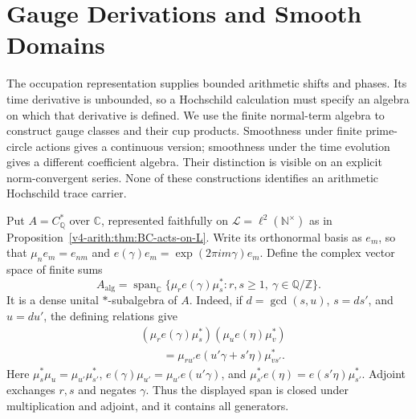 \section{Gauge Derivations and Smooth Domains}
\label{v4-arith:cs:HH-comparison}

The occupation representation supplies bounded arithmetic shifts and
phases. Its time derivative is unbounded, so a Hochschild calculation
must specify an algebra on which that derivative is defined. We use
the finite normal-term algebra to construct gauge classes and their
cup products. Smoothness under finite prime-circle actions gives a
continuous version; smoothness under the time evolution gives a
different coefficient algebra. Their distinction is visible on an
explicit norm-convergent series. None of these constructions identifies
an arithmetic Hochschild trace carrier.

Put \(A=C_{\mathbb Q}^*\) over \(\mathbb C\), represented faithfully
on \(\mathcal L=\ell^2(\mathbb N^\times)\) as in
Proposition~\ref{v4-arith:thm:BC-acts-on-L}. Write its orthonormal
basis as \(e_m\), so that
\(\mu_n e_m=e_{nm}\) and
\(e(\gamma)e_m=\exp(2\pi i m\gamma)e_m\).
Define the complex vector space of finite sums
\[
 A_{\mathrm{alg}}=
 \operatorname{span}_{\mathbb C}
 \{\mu_r e(\gamma)\mu_s^*:r,s\ge1,\ \gamma\in\mathbb Q/\mathbb Z\}.
\]
It is a dense unital \(*\)-subalgebra of \(A\). Indeed, if
\(d=\gcd(s,u)\), \(s=ds'\), and \(u=du'\), the defining relations give
\begin{align*}
 &(\mu_r e(\gamma)\mu_s^*)(\mu_u e(\eta)\mu_v^*)\\
 &\hspace{2em}=\mu_{ru'}e(u'\gamma+s'\eta)\mu_{vs'}^*.
\end{align*}
Here \(\mu_s^*\mu_u=\mu_{u'}\mu_{s'}^*\),
\(e(\gamma)\mu_{u'}=\mu_{u'}e(u'\gamma)\), and
\(\mu_{s'}^*e(\eta)=e(s'\eta)\mu_{s'}^*\).
Adjoint exchanges \(r,s\) and negates \(\gamma\).
Thus the displayed span is closed under multiplication and adjoint,
and it contains all generators.

